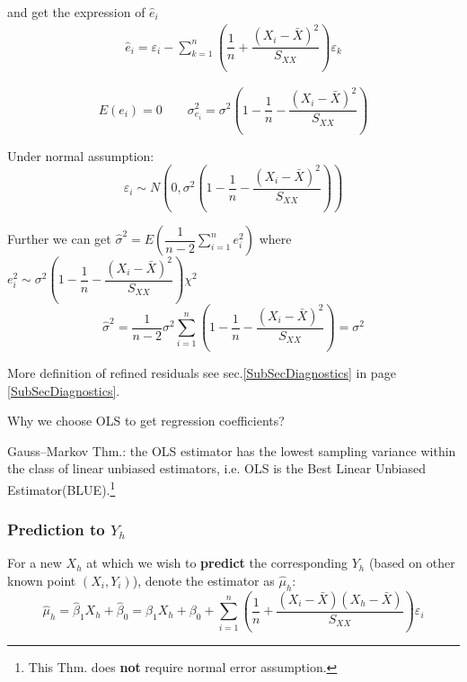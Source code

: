     and get the expression of $ \hat{e}_i $
    \begin{equation}
        \begin{aligned}
            \hat{e}_i=\varepsilon _i-\sum_{k=1}^n\left( \dfrac{1}{n}+\dfrac{(X_i-\bar{X})^2}{S_{XX}} \right)\varepsilon _k
        \end{aligned}
    \end{equation}
    
    
    \begin{equation}
        E(e_i)=0\qquad \sigma ^2_{e_i}=\sigma ^2 \left( 1-\dfrac{1}{n}-\dfrac{(X_i-\bar{X})^2}{S_{XX}} \right)
    \end{equation}

    Under normal assumption:
    \begin{equation}\label{EqaSamplingDistributionOfResiduals}
        \varepsilon _i\sim N(0,\sigma ^2\left( 1-\dfrac{1}{n}-\dfrac{(X_i-\bar{X})^2}{S_{XX}} \right) ) 
    \end{equation}
    

    Further we can get $ \hat{\sigma }^2=E(\dfrac{1}{n-2}\sum_{i=1}^ne_i^2) $ where $ e_i^2\sim \sigma ^2\left( 1-\dfrac{1}{n}-\dfrac{(X_i-\bar{X})^2}{S_{XX}} \right)\chi^2 $
    \begin{equation}
        \hat{\sigma }^2=\dfrac{1}{n-2}\sigma ^2\sum_{i=1}^n(1-\dfrac{1}{n}-\dfrac{(X_i-\bar{X})^2}{S_{XX}})=\sigma ^2
    \end{equation}
    
    More definition of refined residuals see sec.\ref{SubSecDiagnostics} in page \ref{SubSecDiagnostics}.
    


\begin{point}
    Why we choose OLS to get regression coefficients?


    Gauss–Markov Thm.: the OLS estimator has the lowest sampling variance within the class of linear unbiased estimators, i.e. OLS is the Best Linear Unbiased Estimator(BLUE).\footnote{This Thm. does \textbf{not }require normal error assumption.}
\end{point}
    



\subsubsection{Prediction to $ Y_h $}
    For a new $ X_h $ at which we wish to \textbf{predict }the corresponding $ Y_h $ (based on other known point $ (X_i,Y_i) $), denote the estimator as $ \hat{\mu}_h $:
    \begin{equation}
        \hat{\mu}_h=\hat{\beta}_1X_h+\hat{\beta}_0 =\beta_1X_h+\beta _0+\sum_{i=1}^n\left( \dfrac{1}{n}+\dfrac{(X_i-\bar{X})(X_h-\bar{X})}{S_{XX}} \right)\varepsilon _i
    \end{equation}
    
